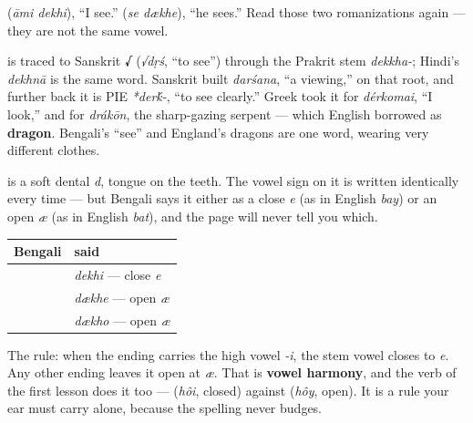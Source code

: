   (\emph{āmi dekhi}), \textquotedblleft{}I see.\textquotedblright{}   (\emph{se dækhe}), \textquotedblleft{}he sees.\textquotedblright{} Read those two romanizations again — they are not the same vowel.

\begin{cousinweb}
\textbf{} is traced to Sanskrit \textbf{√} (\emph{√dṛś}, \textquotedblleft{}to see\textquotedblright{}) through the Prakrit stem \emph{dekkha-}; Hindi's \emph{dekhnā} is the same word. Sanskrit built \emph{darśana}, \textquotedblleft{}a viewing,\textquotedblright{} on that root, and further back it is PIE \emph{*der\'{k}-}, \textquotedblleft{}to see clearly.\textquotedblright{} Greek took it for \emph{dérkomai}, \textquotedblleft{}I look,\textquotedblright{} and for \emph{drákōn}, the sharp-gazing serpent — which English borrowed as \textbf{dragon}. Bengali's \textquotedblleft{}see\textquotedblright{} and England's dragons are one word, wearing very different clothes.
\end{cousinweb}

\begin{sounds}
\textbf{} is a soft dental \emph{d}, tongue on the teeth. The vowel sign \textbf{} on it is written identically every time — but Bengali says it either as a close \emph{e} (as in English \emph{bay}) or an open \emph{æ} (as in English \emph{bat}), and the page will never tell you which.
\end{sounds}

\begin{grammarlens}[title={Grammar Lens: the ending decides the vowel}]
\noindent
\begin{tabularx}{\linewidth}{@{}>{\raggedright\arraybackslash}X>{\raggedright\arraybackslash}X@{}}
\toprule
\textbf{Bengali} & \textbf{said} \\
\midrule
\bn{আমি} \bn{দেখি} & \emph{dekhi} — close \emph{e} \\
\bn{সে} \bn{দেখে} & \emph{dækhe} — open \emph{æ} \\
\bn{তুমি} \bn{দেখো} & \emph{dækho} — open \emph{æ} \\
\bottomrule
\end{tabularx}

The rule: when the ending carries the high vowel \emph{-i}, the stem vowel closes to \emph{e}. Any other ending leaves it open at \emph{æ}. That is \textbf{vowel harmony}, and the verb of the first lesson does it too —   (\emph{hôi}, closed) against   (\emph{hôy}, open). It is a rule your ear must carry alone, because the spelling never budges.
\end{grammarlens}

